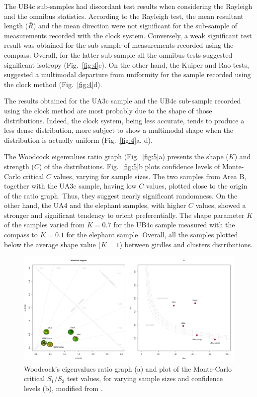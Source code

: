 \documentclass[preprint,authoryear,times]{elsarticle} %
\begin{document}
The UB4c sub-samples had discordant test results when considering the Rayleigh and the omnibus statistics. According to the Rayleigh test, the mean resultant length ($\bar{R}$) and the mean direction were not significant for the sub-sample of measurements recorded with the clock system. Conversely, a weak significant test result was obtained for the sub-sample of measurements recorded using the compass. Overall, for the latter sub-sample all the omnibus tests suggested significant isotropy (Fig.~\ref{fig:4}e). On the other hand, the Kuiper and Rao tests, suggested a multimodal departure from uniformity for the sample recorded using the clock method (Fig.~\ref{fig:4}d).

The results obtained for the UA3c sample and the UB4c sub-sample recorded using the clock method are most probably due to the shape of those distributions. Indeed, the clock system, being less accurate, tends to produce a less dense distribution, more subject to show a multimodal shape when the distribution is actually uniform (Fig.~\ref{fig:4}a, d).

The Woodcock eigenvalues ratio graph (Fig.~\ref{fig:5}a) presents the shape ($K$) and strength ($C$) of the distributions. Fig.~\ref{fig:5}b plots confidence levels of Monte-Carlo critical $C$ values, varying for sample sizes. The two samples from Area B, together with the UA3c sample, having low $C$ values, plotted close to the origin of the ratio graph. Thus, they suggest nearly significant randomness. On the other hand, the UA4 and the elephant samples, with higher $C$ values, showed a stronger and significant tendency to orient preferentially. The shape parameter $K$ of the samples varied from $K=0.7$ for the UB4c sample measured with the compass to $K=0.1$ for the elephant sample. Overall, all the samples plotted below the average shape value ($K=1$) between girdles and clusters distributions.

\begin{figure}[]
  \centering
  \includegraphics[width=1\textwidth]{../artwork/Fig6.pdf}
  \caption{Woodcock's eigenvalues ratio graph (a) and plot of the Monte-Carlo critical $S_1/S_3$ test values, for varying sample sizes and confidence levels (b), modified from \cite{Woodcock1983}.}
  \label{fig:6}
\end{figure}
\end{document}
